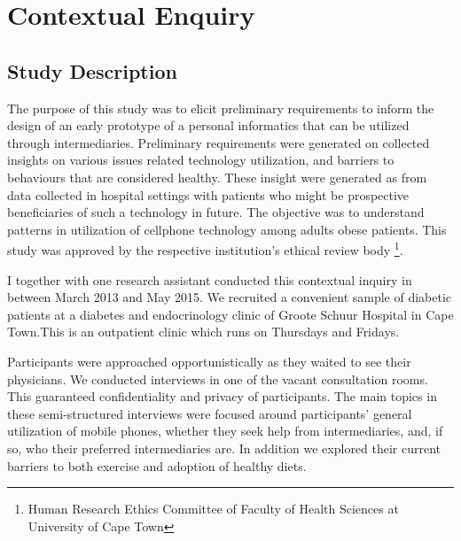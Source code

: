 
\chapter{Contextual Enquiry} %

\label{contextualenqchapter} %


\section{Study Description}
The purpose of this study was to elicit preliminary requirements to inform the design of an early prototype of a personal informatics that can be utilized through intermediaries. Preliminary requirements were generated on collected insights on various issues related technology utilization, and  barriers to behaviours that are considered healthy. These insight were generated as from data collected in hospital settings with patients who might be prospective beneficiaries of such a technology in future. The objective was to understand patterns in utilization of cellphone technology among adults obese patients. This study was approved by the respective institution's ethical review body \footnote{Human Research Ethics Committee of Faculty of Health Sciences at University of Cape Town}.

I together with one research assistant conducted this contextual inquiry in between March 2013 and May 2015. We recruited a convenient sample of diabetic patients at a diabetes and endocrinology clinic of Groote Schuur
Hospital in Cape Town.This is an outpatient clinic which runs on Thursdays and Fridays.

Participants were approached opportunistically as they waited to see their physicians. We conducted interviews in one of the vacant consultation rooms. This guaranteed confidentiality and privacy of participants. The main topics in these semi-structured interviews were focused around participants' general utilization of mobile phones, whether they seek help from intermediaries, and, if so, who their preferred intermediaries are. In addition we explored their current barriers to both exercise  and adoption of healthy diets.

